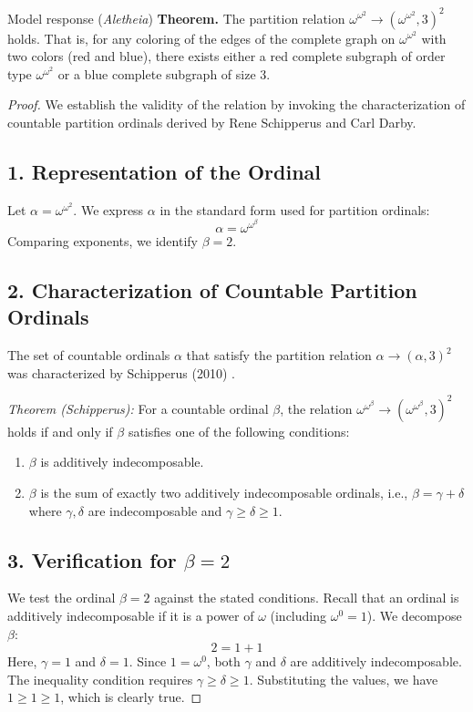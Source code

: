\documentclass[11pt]{article}
\begin{document}
\begin{solution}{Model response (\emph{Aletheia})}
    \textbf{Theorem.} The partition relation $\omega^{\omega^2} \to (\omega^{\omega^2}, 3)^2$ holds. That is, for any coloring of the edges of the complete graph on $\omega^{\omega^2}$ with two colors (red and blue), there exists either a red complete subgraph of order type $\omega^{\omega^2}$ or a blue complete subgraph of size 3.

\begin{proof}
We establish the validity of the relation by invoking the characterization of countable partition ordinals derived by Rene Schipperus and Carl Darby.

\subsection*{1. Representation of the Ordinal}
Let $\alpha = \omega^{\omega^2}$. We express $\alpha$ in the standard form used for partition ordinals:
\[ \alpha = \omega^{\omega^\beta} \]
Comparing exponents, we identify $\beta = 2$.

\subsection*{2. Characterization of Countable Partition Ordinals}
The set of countable ordinals $\alpha$ that satisfy the partition relation $\alpha \to (\alpha, 3)^2$ was characterized by Schipperus (2010) \cite{schipperus2010}.

\textit{Theorem (Schipperus):}
For a countable ordinal $\beta$, the relation $\omega^{\omega^\beta} \to (\omega^{\omega^\beta}, 3)^2$ holds if and only if $\beta$ satisfies one of the following conditions:
\begin{enumerate}
    \item $\beta$ is additively indecomposable.
    \item $\beta$ is the sum of exactly two additively indecomposable ordinals, i.e., $\beta = \gamma + \delta$ where $\gamma, \delta$ are indecomposable and $\gamma \ge \delta \ge 1$.
\end{enumerate}

\subsection*{3. Verification for $\beta = 2$}
We test the ordinal $\beta = 2$ against the stated conditions. Recall that an ordinal is additively indecomposable if it is a power of $\omega$ (including $\omega^0 = 1$). We decompose $\beta$:
\[ 2 = 1 + 1 \]
Here, $\gamma = 1$ and $\delta = 1$. Since $1 = \omega^0$, both $\gamma$ and $\delta$ are additively indecomposable. The inequality condition requires $\gamma \ge \delta \ge 1$. Substituting the values, we have $1 \ge 1 \ge 1$, which is clearly true.


\end{proof}
\end{solution}
\end{document}
